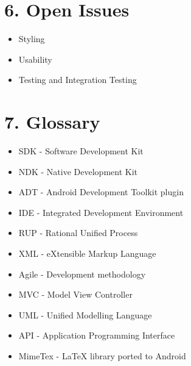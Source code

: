 \documentclass[29pt,a4paper]{moderncv}
\begin{document}
	\section*{\textbf{6. Open Issues}}
	\vspace{4mm}
		\begin{itemize}
			\item Styling
			\item Usability
			\item Testing and Integration Testing
			
		\end{itemize}
	\vspace{5mm}
	
	\section*{\textbf{7. Glossary}}
	\vspace{4mm}
		\begin{itemize}
			\item SDK - Software Development Kit
			\item NDK - Native Development Kit
			\item ADT - Android Development Toolkit plugin
			\item IDE - Integrated Development Environment
			\item RUP - Rational Unified Process
			\item XML - eXtensible Markup Language
			\item Agile - Development methodology
			\item MVC - Model View Controller
			\item UML - Unified Modelling Language
			\item API - Application Programming Interface
			\item MimeTex - LaTeX library ported to Android
			
		\end{itemize}
	\vspace{5mm}
\end{document}
